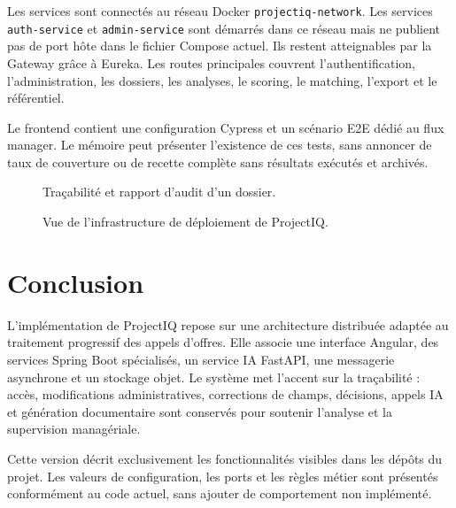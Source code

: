 Les services sont connectés au réseau Docker \texttt{projectiq-network}. Les services \texttt{auth-service} et \texttt{admin-service} sont démarrés dans ce réseau mais ne publient pas de port hôte dans le fichier Compose actuel. Ils restent atteignables par la Gateway grâce à Eureka. Les routes principales couvrent l’authentification, l’administration, les dossiers, les analyses, le scoring, le matching, l’export et le référentiel.

Le frontend contient une configuration Cypress et un scénario E2E dédié au flux manager. Le mémoire peut présenter l’existence de ces tests, sans annoncer de taux de couverture ou de recette complète sans résultats exécutés et archivés.

\begin{figure}[H]
\centering
\caption{Traçabilité et rapport d’audit d’un dossier.}
\label{fig:audit}
\end{figure}

\begin{figure}[H]
\centering
\caption{Vue de l’infrastructure de déploiement de ProjectIQ.}
\label{fig:infrastructure}
\end{figure}

\section{Conclusion}

L’implémentation de ProjectIQ repose sur une architecture distribuée adaptée au traitement progressif des appels d’offres. Elle associe une interface Angular, des services Spring Boot spécialisés, un service IA FastAPI, une messagerie asynchrone et un stockage objet. Le système met l’accent sur la traçabilité : accès, modifications administratives, corrections de champs, décisions, appels IA et génération documentaire sont conservés pour soutenir l’analyse et la supervision managériale.

Cette version décrit exclusivement les fonctionnalités visibles dans les dépôts du projet. Les valeurs de configuration, les ports et les règles métier sont présentés conformément au code actuel, sans ajouter de comportement non implémenté.
